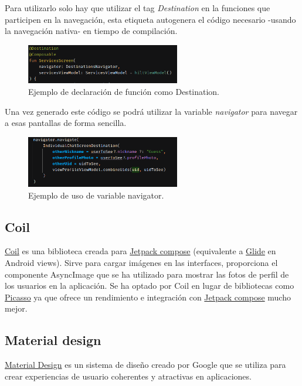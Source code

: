 Para utilizarlo solo hay que utilizar el tag \textit{Destination} en la funciones que participen en la navegación, esta etiqueta autogenera el código necesario -usando la navegación nativa- en tiempo de compilación. 
\begin{figure}[h]
	\centering
	\includegraphics[width = 0.6\textwidth]{Imagenes/Fuentes/ejemplo_destination.png}
	\caption{Ejemplo de declaración de función como Destination.}
	\label{fig:ejemplo_destination}
\end{figure}

Una vez generado este código se podrá utilizar la variable \textit{navigator} para navegar a esas pantallas de forma sencilla. 
\begin{figure}[h]
	\centering
	\includegraphics[width = 0.6\textwidth]{Imagenes/Fuentes/ejemplo_navigator.png}
	\caption{Ejemplo de uso de variable navigator.}
	\label{fig:ejemplo_navigator}
\end{figure}

\hypertarget{subsec:coil}{}
\subsection{Coil} 
\href{https://coil-kt.github.io/coil/compose/}{Coil} es una biblioteca creada para \hyperlink{subsec:compose}{Jetpack compose} (equivalente a \href{https://github.com/bumptech/glide}{Glide} en Android views). Sirve para cargar imágenes en las interfaces, proporciona el componente AsyncImage que se ha utilizado para mostrar las fotos de perfil de los usuarios en la aplicación. Se ha optado por Coil en lugar de bibliotecas como \href{https://square.github.io/picasso/}{Picasso} ya que ofrece un rendimiento e integración con \hyperlink{subsec:compose}{Jetpack compose} mucho mejor. 
\subsection{Material design}
\label{subsec:material_design}
\href{https://m3.material.io/}{Material Design} es un sistema de diseño creado por Google que se utiliza para crear experiencias de usuario coherentes y atractivas en aplicaciones. 

